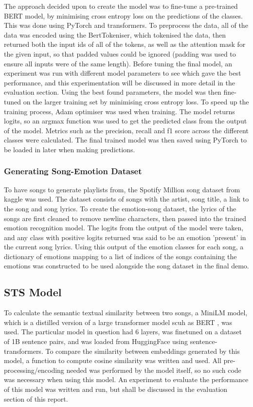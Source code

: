 \documentclass[11pt]{article}
\begin{document}
The approach decided upon to create the model was to fine-tune a pre-trained BERT \cite{bert} model, by minimising cross entropy loss on the predictions of the classes. This was done using PyTorch and transformers. To preprocess the data, all of the data was encoded using the BertTokeniser, which tokenised the data, then returned both the input ids of all of the tokens, as well as the attention mask for the given input, so that padded values could be ignored (padding was used to ensure all inputs were of the same length). Before tuning the final model, an experiment was run with different model parameters to see which gave the best performance, and this experimentation will be discussed in more detail in the evaluation section. Using the best found parameters, the model was then fine-tuned on the larger training set by minimising cross entropy loss. To speed up the training process, Adam optimiser was used when training. The model returns logits, so an argmax function was used to get the predicted class from the output of the model. Metrics such as the precision, recall and f1 score across the different classes were calculated. The final trained model was then saved using PyTorch to be loaded in later when making predictions.

\subsubsection{Generating Song-Emotion Dataset}
To have songs to generate playlists from, the Spotify Million song dataset \cite{spotify} from kaggle was used. The dataset consists of songs with the artist, song title, a link to the song and song lyrics. To create the emotion-song dataset, the lyrics of the songs are first cleaned to remove newline characters, then passed into the trained emotion recognition model. The logits from the output of the model were taken, and any class with positive logits returned was said to be an emotion 'present' in the current song lyrics. Using this output of the emotion classes for each song, a dictionary of emotions mapping to a list of indices of the songs containing the emotions was constructed to be used alongside the song dataset in the final demo.

\subsection{STS Model}

To calculate the semantic textual similarity between two songs, a MiniLM \cite{minilm} model, which is a distilled version of a large transformer model scuh as BERT \cite{bert}, was used. The particular model in question had 6 layers, was finetuned on a dataset of 1B sentence pairs, and was loaded from HuggingFace \cite{stsmodel} using sentence-transformers. To compare the similarity between embeddings generated by this model, a function to compute cosine similarity was written and used. All pre-processing/encoding needed was performed by the model itself, so no such code was necessary when using this model. 
An experiment to evaluate the performance of this model was written and run, but shall be discussed in the evaluation section of this report.
\end{document}
